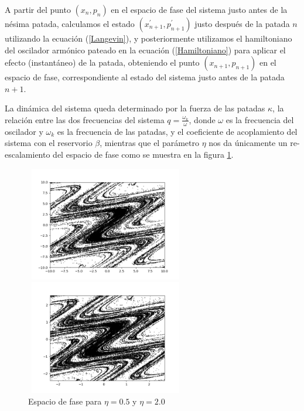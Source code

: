 \documentclass[letterpaper,12pt,oneside]{book}
\begin{document}
	 A partir del punto $(x_n, p_n)$ en el espacio de fase del sistema justo antes de la n\'esima patada, calculamos el estado $(x_{n+1}^{'}, p_{n+1}^{'})$ justo despu\'es de la patada $n$ utilizando la ecuaci\'on (\ref{Langevin}), y posteriormente utilizamos el hamiltoniano del oscilador arm\'onico pateado en la ecuaci\'on (\ref{Hamiltoniano}) para aplicar el efecto (instant\'aneo) de la patada, obteniendo el punto $(x_{n+1}, p_{n+1})$ en el espacio de fase, correspondiente al estado del sistema justo antes de la patada $n+1$.
	
	La dinámica del sistema queda determinado por la fuerza de las patadas $\kappa$, la relación entre las dos frecuencias del sistema $q = \frac{\omega_k}{\omega}$, donde $\omega$ es la frecuencia del oscilador y $\omega_k$ es la frecuencia de las patadas, y el coeficiente de acoplamiento del sistema con el reservorio $\beta$, mientras que el parámetro $\eta$ nos da únicamente un  re-escalamiento del espacio de fase \cite{PradoTesis} como se muestra en la figura \ref{Img:Reescalamiento}.
	
	\begin{figure}[h!]
		\centering
		\begin{minipage}{0.35\textwidth}
			\centering
			\includegraphics[width=7cm,height=5cm]{Figures/Eta05}
		\end{minipage}
		\begin{minipage}{0.35\textwidth}
			\centering
			\includegraphics[width=7cm,height=5cm]{Figures/Eta20}
		\end{minipage}
		\caption{Espacio de fase para $\eta=0.5$ y $\eta=2.0$}
		\label{Img:Reescalamiento}
	\end{figure}
\end{document}

